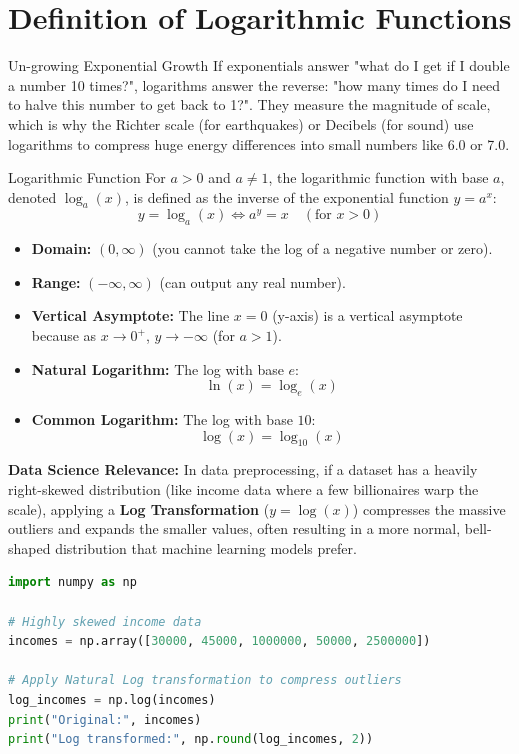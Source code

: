 \section{Definition of Logarithmic Functions}

\begin{intuitionbox}{Un-growing Exponential Growth}
If exponentials answer "what do I get if I double a number 10 times?", logarithms answer the reverse: "how many times do I need to halve this number to get back to 1?". They measure the magnitude of scale, which is why the Richter scale (for earthquakes) or Decibels (for sound) use logarithms to compress huge energy differences into small numbers like 6.0 or 7.0.
\end{intuitionbox}

\begin{definitionbox}{Logarithmic Function}
For $a > 0$ and $a \neq 1$, the logarithmic function with base $a$, denoted $\log_a(x)$, is defined as the inverse of the exponential function $y = a^x$:
$$y = \log_a(x) \iff a^y = x \quad (\text{for } x > 0)$$
\begin{itemize}
    \item {}\textbf{Domain:} $(0, \infty)$ (you cannot take the log of a negative number or zero).
    \item {}\textbf{Range:} $(-\infty, \infty)$ (can output any real number).
    \item \textbf{Vertical Asymptote:} The line $x = 0$ (y-axis) is a vertical asymptote because as $x \to 0^+$, $y \to -\infty$ (for $a > 1$).
    \item {}\textbf{Natural Logarithm:} The log with base $e$:
    $$\ln(x) = \log_e(x)$$
    \item {}\textbf{Common Logarithm:} The log with base $10$:
    $$\log(x) = \log_{10}(x)$$
\end{itemize}
\end{definitionbox}

\textbf{Data Science Relevance:} In data preprocessing, if a dataset has a heavily right-skewed distribution (like income data where a few billionaires warp the scale), applying a \textbf{Log Transformation} ($y = \log(x)$) compresses the massive outliers and expands the smaller values, often resulting in a more normal, bell-shaped distribution that machine learning models prefer.

\begin{lstlisting}[language=Python, caption=Data Science: Log Transformation in Python]
import numpy as np

# Highly skewed income data
incomes = np.array([30000, 45000, 1000000, 50000, 2500000])

# Apply Natural Log transformation to compress outliers
log_incomes = np.log(incomes)
print("Original:", incomes)
print("Log transformed:", np.round(log_incomes, 2))
\end{lstlisting}


